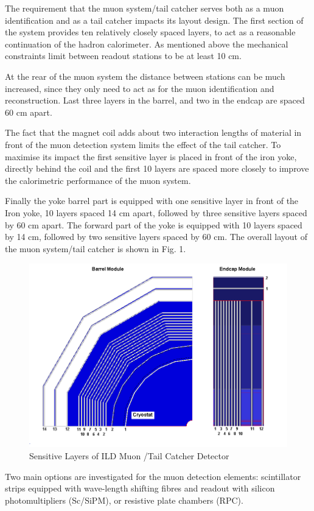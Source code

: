\documentclass[12pt,twoside,a4paper]{book}
\begin{document}
The requirement that the muon system/tail catcher serves both as a muon identification and as a tail catcher impacts its layout design.
The first section of the system provides ten relatively closely spaced layers, to act as a reasonable continuation of the hadron calorimeter.
As mentioned above the mechanical constraints limit between readout stations to be at least 10 cm.

At the rear of the muon system the distance between stations can be much increased, since they only need to act as for the  muon identification and reconstruction.
Last three layers in the barrel, and two in the endcap are spaced 60 cm apart.

The fact that the magnet coil adds about two interaction lengths of material in front of the muon detection system limits the effect of the tail catcher.
To maximise its impact the first sensitive layer is placed in front of the iron yoke, directly behind the coil and the first 10 layers are spaced more closely
to improve the calorimetric performance of the muon system.

Finally the yoke barrel part is equipped with one sensitive layer in front of the Iron yoke, 10 layers spaced 14 cm apart, followed by three sensitive layers spaced by 60 cm apart. The forward part of the yoke is equipped with 10 layers spaced by 14 cm, followed by two sensitive layers spaced by 60 cm. The overall layout of the muon system/tail catcher is shown in Fig. 1.

\begin{figure}
	\centering
\includegraphics[height=8cm]{2D_barel_endcap.png}
	\caption{Sensitive Layers of ILD Muon /Tail Catcher Detector}
	\label{ild:fig:muon:concept}
\end{figure}

Two main options are investigated for the muon detection elements: scintillator strips equipped with wave-length shifting fibres and readout with silicon photomultipliers (Sc/SiPM), or resistive plate chambers (RPC).
\end{document}
